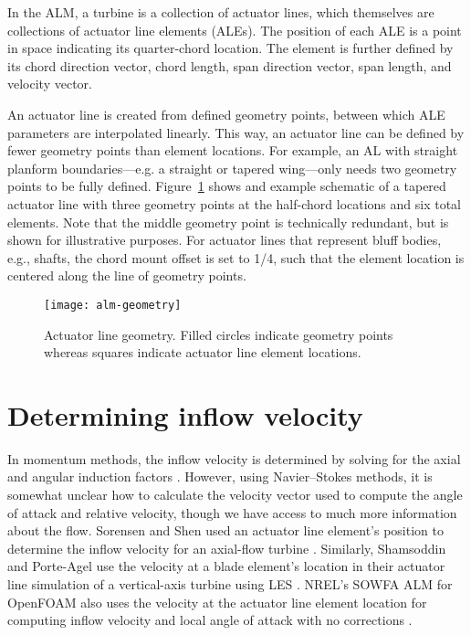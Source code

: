 In the ALM, a turbine is a collection of actuator lines, which themselves are
collections of actuator line elements (ALEs). The position of each ALE is a
point in space indicating its quarter-chord location. The element is further
defined by its chord direction vector, chord length, span direction vector, span
length, and velocity vector.

An actuator line is created from defined geometry points, between which ALE
parameters are interpolated linearly. This way, an actuator line can be defined
by fewer geometry points than element locations. For example, an AL with
straight planform boundaries---e.g. a straight or tapered wing---only needs two
geometry points to be fully defined. Figure~\ref{fig:AL-geom} shows and example
schematic of a tapered actuator line with three geometry points at the
half-chord locations and six total elements. Note that the middle geometry point
is technically redundant, but is shown for illustrative purposes. For actuator
lines that represent bluff bodies, e.g., shafts, the chord mount offset is set
to 1/4, such that the element location is centered along the line of geometry
points.

\begin{figure}
    \centering
    
    \texttt{[image: alm-geometry]}
    
    \caption{Actuator line geometry. Filled circles indicate geometry points
        whereas squares indicate actuator line element locations.}
    
    \label{fig:AL-geom}
\end{figure}


\section{Determining inflow velocity}

In momentum methods, the inflow velocity is determined by solving for the axial
and angular induction factors \cite{Manwell2002}. However, using Navier--Stokes
methods, it is somewhat unclear how to calculate the velocity vector used to
compute the angle of attack and relative velocity, though we have access to much
more information about the flow. Sorensen and Shen used an actuator line
element's position to determine the inflow velocity for an axial-flow turbine
\cite{Sorensen2002}. Similarly, Shamsoddin and Porte-Agel use the velocity at a
blade element's location in their actuator line simulation of a vertical-axis
turbine using LES \cite{Shamsoddin2014}. NREL's SOWFA ALM for OpenFOAM also uses
the velocity at the actuator line element location for computing inflow velocity
and local angle of attack with no corrections \cite{Churchfield2013}.

